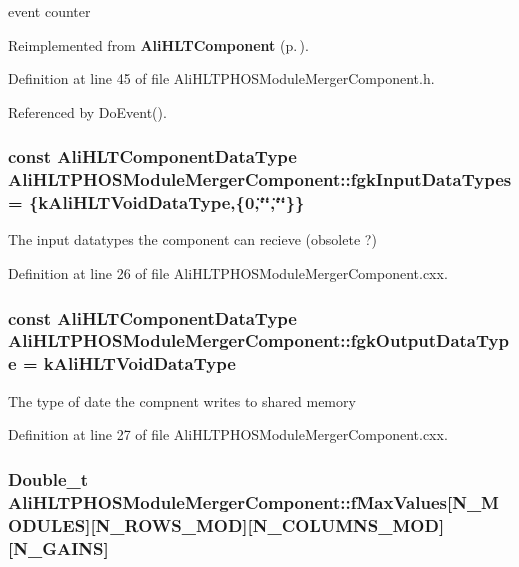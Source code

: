 event counter 

Reimplemented from {\bf Ali\-HLTComponent} {\rm (p.\,\pageref{classAliHLTComponent_r2})}.

Definition at line 45 of file Ali\-HLTPHOSModule\-Merger\-Component.h.

Referenced by Do\-Event().
\subsubsection{\setlength{\rightskip}{0pt plus 5cm}const {\bf Ali\-HLTComponent\-Data\-Type} {\bf Ali\-HLTPHOSModule\-Merger\-Component::fgk\-Input\-Data\-Types} = \{{\bf k\-Ali\-HLTVoid\-Data\-Type},\{0,\char`\"{}\char`\"{},\char`\"{}\char`\"{}\}\}\hspace{0.3cm}{\tt  [static, private]}}\label{classAliHLTPHOSModuleMergerComponent_v0}


The input datatypes the component can recieve (obsolete ?) 

Definition at line 26 of file Ali\-HLTPHOSModule\-Merger\-Component.cxx.
\subsubsection{\setlength{\rightskip}{0pt plus 5cm}const {\bf Ali\-HLTComponent\-Data\-Type} {\bf Ali\-HLTPHOSModule\-Merger\-Component::fgk\-Output\-Data\-Type} = {\bf k\-Ali\-HLTVoid\-Data\-Type}\hspace{0.3cm}{\tt  [static, private]}}\label{classAliHLTPHOSModuleMergerComponent_v1}


The type of date the compnent writes to shared memory 

Definition at line 27 of file Ali\-HLTPHOSModule\-Merger\-Component.cxx.
\subsubsection{\setlength{\rightskip}{0pt plus 5cm}Double\_\-t {\bf Ali\-HLTPHOSModule\-Merger\-Component::f\-Max\-Values}[N\_\-MODULES][N\_\-ROWS\_\-MOD][N\_\-COLUMNS\_\-MOD][N\_\-GAINS]\hspace{0.3cm}{\tt  [private]}}\label{classAliHLTPHOSModuleMergerComponent_r3}


